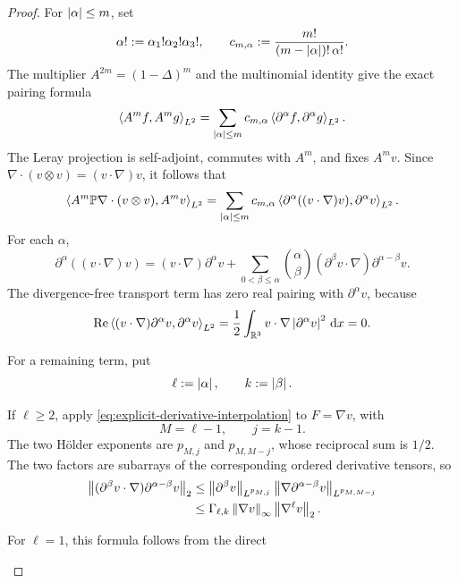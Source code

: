\begin{proof}
For \(\left|\alpha\right|\le m\), set
\[
 \alpha!:=\alpha_1!\alpha_2!\alpha_3!,
 \qquad
 c_{m,\alpha}:=\frac{m!}{(m-\left|\alpha\right|)!\,\alpha!}.
\]
The multiplier \(A^{2m}=(1-\Delta)^m\) and the multinomial identity give the
exact pairing formula
\begin{equation}
 \left\langle A^mf,A^mg\right\rangle_{L^2}
 =\sum_{\left|\alpha\right|\le m}c_{m,\alpha}
   \left\langle \partial^\alpha f,\partial^\alpha g\right\rangle_{L^2}.
 \label{eq:integer-Am-pairing}
\end{equation}
The Leray projection is self-adjoint, commutes with \(A^m\), and fixes
\(A^mv\).  Since
\(\nabla\cdot(v\otimes v)=(v\cdot\nabla)v\), it follows that
\begin{equation}
 \left\langle A^m\mathbb P\nabla\cdot(v\otimes v),A^mv\right\rangle_{L^2}
 =\sum_{\left|\alpha\right|\le m}c_{m,\alpha}
   \left\langle \partial^\alpha((v\cdot\nabla)v),\partial^\alpha v\right\rangle_{L^2}.
 \label{eq:integer-projected-pairing}
\end{equation}
For each \(\alpha\),
\[
 \partial^\alpha((v\cdot\nabla)v)
 =(v\cdot\nabla)\partial^\alpha v
 +\sum_{0<\beta\le\alpha}\binom\alpha\beta
 (\partial^\beta v\cdot\nabla)
 \partial^{\alpha-\beta}v.
\]
The divergence-free transport term has zero real pairing with
\(\partial^\alpha v\), because
\[
 \operatorname{Re}\left\langle (v\cdot\nabla)\partial^\alpha v,\partial^\alpha v\right\rangle_{L^2}
 =\frac12\int_{\mathbb R^3}v\cdot\nabla
   \left|\partial^\alpha v\right|^2\,\mathrm d x=0.
\]
\begin{samepage}
For a remaining term, put
\[
 \ell:=\left|\alpha\right|,
 \qquad k:=\left|\beta\right|.
\]
\par
\end{samepage}
\begin{samepage}
If \(\ell\ge2\), apply
\eqref{eq:explicit-derivative-interpolation} to \(F=\nabla v\), with
\[
 M=\ell-1,
 \qquad j=k-1.
\]
The two H\"older exponents are \(p_{M,j}\) and \(p_{M,M-j}\), whose
reciprocal sum is \(1/2\).  The two factors are subarrays of the corresponding
ordered derivative tensors, so
\begin{align}
 \left\lVert (\partial^\beta v\cdot\nabla)
          \partial^{\alpha-\beta}v\right\rVert_2
 &\le
 \left\lVert \partial^\beta v\right\rVert_{L^{p_{M,j}}}
 \left\lVert \nabla\partial^{\alpha-\beta}v\right\rVert_{L^{p_{M,M-j}}}\notag\\
 &\le\Gamma_{\ell,k}\left\lVert \nabla v\right\rVert_\infty
       \left\lVert \nabla^\ell v\right\rVert_2.
 \label{eq:explicit-commutator-product}
\end{align}
\par
\end{samepage}
\begin{samepage}
For \(\ell=1\), this formula follows from the direct

\end{samepage}
\end{proof}
